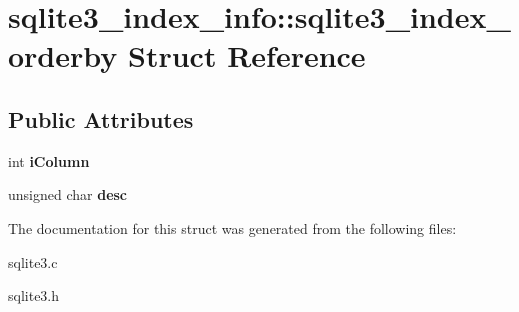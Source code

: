 \hypertarget{structsqlite3__index__info_1_1sqlite3__index__orderby}{\section{sqlite3\-\_\-index\-\_\-info\-:\-:sqlite3\-\_\-index\-\_\-orderby Struct Reference}
\label{structsqlite3__index__info_1_1sqlite3__index__orderby}
}
\subsection*{Public Attributes}
\begin{DoxyCompactItemize}
\item 
\hypertarget{structsqlite3__index__info_1_1sqlite3__index__orderby_a266396085bfda9acef3f13eaa170cd2f}{int {\bfseries i\-Column}}\label{structsqlite3__index__info_1_1sqlite3__index__orderby_a266396085bfda9acef3f13eaa170cd2f}

\item 
\hypertarget{structsqlite3__index__info_1_1sqlite3__index__orderby_a0586d1b5d36221af96aeba8cfc56e9c6}{unsigned char {\bfseries desc}}\label{structsqlite3__index__info_1_1sqlite3__index__orderby_a0586d1b5d36221af96aeba8cfc56e9c6}

\end{DoxyCompactItemize}


The documentation for this struct was generated from the following files\-:\begin{DoxyCompactItemize}
\item 
sqlite3.\-c\item 
sqlite3.\-h\end{DoxyCompactItemize}
